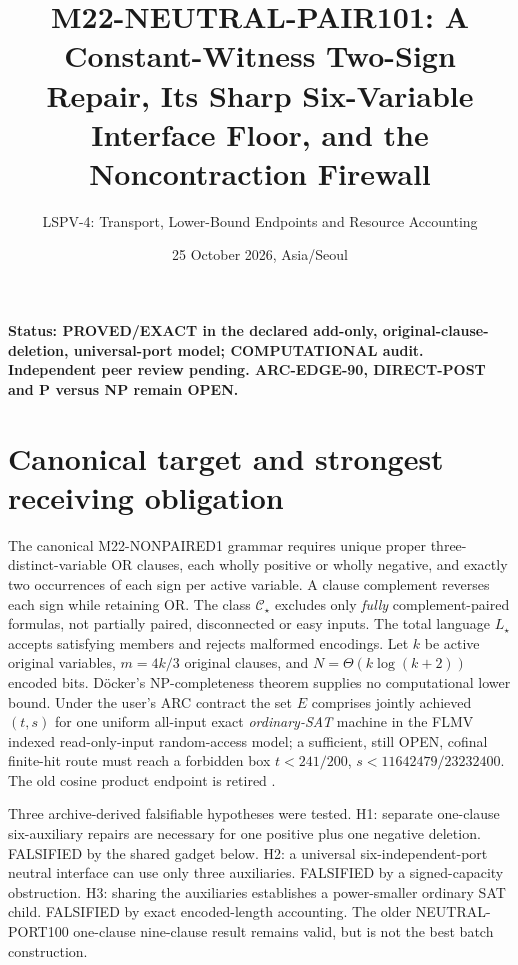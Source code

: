 \documentclass[11pt]{article}
\title{M22-NEUTRAL-PAIR101: A Constant-Witness Two-Sign Repair, Its Sharp Six-Variable Interface Floor, and the Noncontraction Firewall}
\author{LSPV-4: Transport, Lower-Bound Endpoints and Resource Accounting}
\date{25 October 2026, Asia/Seoul}
\begin{document}
\maketitle
\noindent\textbf{Status: PROVED/EXACT in the declared add-only, original-clause-deletion, universal-port model; COMPUTATIONAL audit. Independent peer review pending. ARC-EDGE-90, DIRECT-POST and P versus NP remain OPEN.}

\section{Canonical target and strongest receiving obligation}
The canonical M22-NONPAIRED1 grammar requires unique proper three-distinct-variable OR clauses, each wholly positive or wholly negative, and exactly two occurrences of each sign per active variable. A clause complement reverses each sign while retaining OR. The class $\mathcal C_\star$ excludes only \emph{fully} complement-paired formulas, not partially paired, disconnected or easy inputs. The total language $L_\star$ accepts satisfying members and rejects malformed encodings. Let $k$ be active original variables, $m=4k/3$ original clauses, and $N=\Theta(k\log(k+2))$ encoded bits. D\"ocker's NP-completeness theorem \cite{docker} supplies no computational lower bound. Under the user's ARC contract the set $E$ comprises jointly achieved $(t,s)$ for one uniform all-input exact \emph{ordinary-SAT} machine in the FLMV indexed read-only-input random-access model; a sufficient, still OPEN, cofinal finite-hit route must reach a forbidden box $t<241/200$, $s<11642479/23232400$. The old cosine product endpoint is retired \cite{flmv,final}.

Three archive-derived falsifiable hypotheses were tested. H1: separate one-clause six-auxiliary repairs are necessary for one positive plus one negative deletion. FALSIFIED by the shared gadget below. H2: a universal six-independent-port neutral interface can use only three auxiliaries. FALSIFIED by a signed-capacity obstruction. H3: sharing the auxiliaries establishes a power-smaller ordinary SAT child. FALSIFIED by exact encoded-length accounting. The older NEUTRAL-PORT100 one-clause nine-clause result remains valid, but is not the best batch construction.
\end{document}
